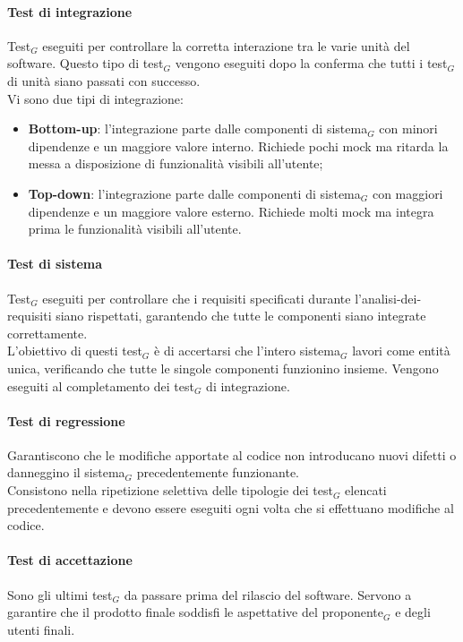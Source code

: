 \documentclass[10pt]{article}
\begin{document}
\begin{justify}
    \paragraph{Test di integrazione}
    Test$_G$ eseguiti per controllare la corretta interazione tra le varie unità del software. Questo tipo di test$_G$ vengono eseguiti dopo la conferma che tutti i test$_G$ di unità siano passati con successo.\\
    Vi sono due tipi di integrazione:
    \begin{itemize}
      \item \textbf{Bottom-up}: l'integrazione parte dalle componenti di sistema$_G$ con minori dipendenze e un maggiore valore interno. Richiede pochi mock ma ritarda la messa a disposizione di funzionalità visibili all'utente;
      \item \textbf{Top-down}: l'integrazione parte dalle componenti di sistema$_G$ con maggiori dipendenze e un maggiore valore esterno. Richiede molti mock ma integra prima le funzionalità visibili all'utente.
    \end{itemize}

    \paragraph{Test di sistema}
    Test$_G$ eseguiti per controllare che i requisiti specificati durante l'analisi-dei-requisiti siano rispettati, garantendo che tutte le componenti siano integrate correttamente.\\
    L'obiettivo di questi test$_G$ è di accertarsi che l'intero sistema$_G$ lavori come entità unica, verificando che tutte le singole componenti funzionino insieme. Vengono eseguiti al completamento dei test$_G$ di integrazione.

    \paragraph{Test di regressione}
    Garantiscono che le modifiche apportate al codice non introducano nuovi difetti o danneggino il sistema$_G$ precedentemente funzionante.\\
    Consistono nella ripetizione selettiva delle tipologie dei test$_G$ elencati precedentemente e devono essere eseguiti ogni volta che si effettuano modifiche al codice.

    \paragraph{Test di accettazione}
    Sono gli ultimi test$_G$ da passare prima del rilascio del software. Servono a garantire che il prodotto finale soddisfi le aspettative del proponente$_G$ e degli utenti finali.


\end{justify}
\end{document}
